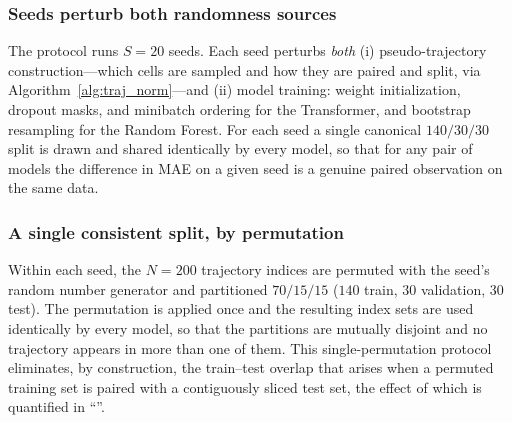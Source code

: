 \documentclass[10pt,letterpaper]{article}
\begin{document}
\subsubsection*{Seeds perturb both randomness sources}
The protocol runs $S=20$ seeds. Each seed perturbs \emph{both} (i) pseudo-trajectory construction---which cells are sampled and how they are paired and split, via Algorithm~\ref{alg:traj_norm}---and (ii) model training: weight initialization, dropout masks, and minibatch ordering for the Transformer, and bootstrap resampling for the Random Forest. For each seed a single canonical $140/30/30$ split is drawn and shared identically by every model, so that for any pair of models the difference in MAE on a given seed is a genuine paired observation on the same data.

\subsubsection*{A single consistent split, by permutation}
Within each seed, the $N=200$ trajectory indices are permuted with the seed's random number generator and partitioned $70/15/15$ ($140$ train, $30$ validation, $30$ test). The permutation is applied once and the resulting index sets are used identically by every model, so that the partitions are mutually disjoint and no trajectory appears in more than one of them. This single-permutation protocol eliminates, by construction, the train--test overlap that arises when a permuted training set is paired with a contiguously sliced test set, the effect of which is quantified in ``''.
\end{document}
